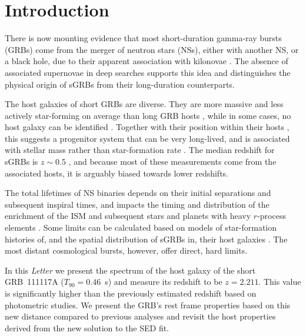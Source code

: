 \documentclass{aa}    %
\begin{document}
\section{Introduction}


There is now mounting evidence that most short-duration gamma-ray bursts (GRBs)
come from the merger of neutron stars (NSs), either with another NS, or a black
hole, due to their apparent association with kilonovae \citep{Barnes2013a,
	Tanvir2013b, Yang2015, Jin2016, Rosswog2016}. The absence of associated
supernovae in deep searches \citep[e.g.][]{Hjorth2005a,Fox2005,Hjorth2005b}
supports this idea and distinguishes the physical origin of sGRBs from their
long-duration counterparts. %

The host galaxies of short GRBs are diverse. They are more massive and less actively 
star-forming on average than long GRB hosts \citep{Fong2013b}, while in some cases, no host 
galaxy can be identified \citep{Berger2010a, Tunnicliffe2014}. Together with their position 
within their hosts \citep{Fong2013a}, this suggests a progenitor system that can be very
long-lived, and is associated with stellar mass rather than star-formation rate
\citep{Berger2014}. The median redshift for sGRBs is $z\sim0.5$ \citep{Berger2014}, and
because most of these measurements come from the associated hosts, it is arguably biased
towards lower redshifts.


The total lifetimes of NS binaries depends on their initial separations and
subsequent inspiral times, and impacts the timing and distribution of the
enrichment of the ISM and subsequent stars and planets with heavy $r$-process
elements \citep{VandeVoort2015, Wallner2015,  Ji2016}. Some limits can be
calculated based on models of star-formation histories of, and the spatial
distribution of sGRBs in, their host galaxies \citep[][]{Berger2014}. The most
distant cosmological bursts, however, offer direct, hard limits.


In this \emph{Letter} we present the spectrum of the host galaxy of the short GRB~111117A ($T_{90}=0.46$~s) and measure its redshift to be $z=2.211$. This value is significantly higher 
than the previously estimated redshift based on photometric studies. 
We present the GRB's rest frame 
properties based on this new distance compared to previous analyses
\citep{Margutti2012,Sakamoto2013} and revisit the host properties derived from
the new solution to the SED fit. %
\end{document}
